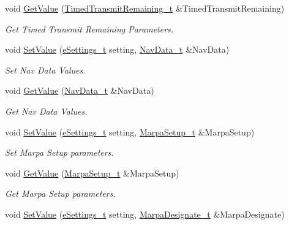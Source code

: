 \begin{DoxyCompactItemize}
void \mbox{\hyperlink{struct_quantum_lib_1_1_setting_data__t_a09948ecc76dd4444419361ed394ae514}{Get\+Value}} (\mbox{\hyperlink{struct_quantum_lib_1_1_timed_transmit_remaining__t}{Timed\+Transmit\+Remaining\+\_\+t}} \&Timed\+Transmit\+Remaining)
\begin{DoxyCompactList}\small\item\em Get Timed Transmit Remaining Parameters. \end{DoxyCompactList}\item 
void \mbox{\hyperlink{struct_quantum_lib_1_1_setting_data__t_af399900443730ee2ad105de5c136b53e}{Set\+Value}} (\mbox{\hyperlink{namespace_quantum_lib_acc8124e3e65bca4aa798d03a55e3d54c}{e\+Settings\+\_\+t}} setting, \mbox{\hyperlink{struct_quantum_lib_1_1_nav_data__t}{Nav\+Data\+\_\+t}} \&Nav\+Data)
\begin{DoxyCompactList}\small\item\em Set Nav Data Values. \end{DoxyCompactList}\item 
void \mbox{\hyperlink{struct_quantum_lib_1_1_setting_data__t_a3fa9a1812192d33a14dbdbc8340ce9ea}{Get\+Value}} (\mbox{\hyperlink{struct_quantum_lib_1_1_nav_data__t}{Nav\+Data\+\_\+t}} \&Nav\+Data)
\begin{DoxyCompactList}\small\item\em Get Nav Data Values. \end{DoxyCompactList}\item 
void \mbox{\hyperlink{struct_quantum_lib_1_1_setting_data__t_a313c27d080a46a9c55dfbd4b2c78eb76}{Set\+Value}} (\mbox{\hyperlink{namespace_quantum_lib_acc8124e3e65bca4aa798d03a55e3d54c}{e\+Settings\+\_\+t}} setting, \mbox{\hyperlink{struct_quantum_lib_1_1_marpa_setup__t}{Marpa\+Setup\+\_\+t}} \&Marpa\+Setup)
\begin{DoxyCompactList}\small\item\em Set Marpa Setup parameters. \end{DoxyCompactList}\item 
void \mbox{\hyperlink{struct_quantum_lib_1_1_setting_data__t_a1c5c478c6e7d54c936a44d0c60c911fc}{Get\+Value}} (\mbox{\hyperlink{struct_quantum_lib_1_1_marpa_setup__t}{Marpa\+Setup\+\_\+t}} \&Marpa\+Setup)
\begin{DoxyCompactList}\small\item\em Get Marpa Setup parameters. \end{DoxyCompactList}\item 
void \mbox{\hyperlink{struct_quantum_lib_1_1_setting_data__t_a29f9db2fed691c198b5c231ac0fb78ae}{Set\+Value}} (\mbox{\hyperlink{namespace_quantum_lib_acc8124e3e65bca4aa798d03a55e3d54c}{e\+Settings\+\_\+t}} setting, \mbox{\hyperlink{struct_quantum_lib_1_1_marpa_designate__t}{Marpa\+Designate\+\_\+t}} \&Marpa\+Designate)

\end{DoxyCompactItemize}
